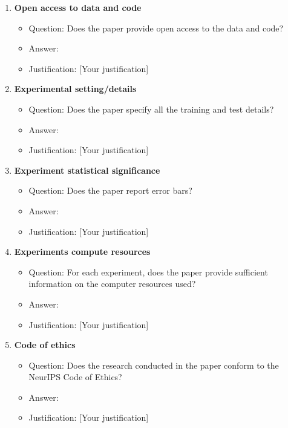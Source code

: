 \documentclass{article}
\begin{document}
\begin{enumerate}
  \item \textbf{Open access to data and code}
  \begin{itemize}
    \item Question: Does the paper provide open access to the data and code?
    \item Answer: \answerNo{}
    \item Justification: [Your justification]
  \end{itemize}

  \item \textbf{Experimental setting/details}
  \begin{itemize}
    \item Question: Does the paper specify all the training and test details?
    \item Answer: \answerYes{}
    \item Justification: [Your justification]
  \end{itemize}

  \item \textbf{Experiment statistical significance}
  \begin{itemize}
    \item Question: Does the paper report error bars?
    \item Answer: \answerYes{}
    \item Justification: [Your justification]
  \end{itemize}

  \item \textbf{Experiments compute resources}
  \begin{itemize}
    \item Question: For each experiment, does the paper provide sufficient information on the computer resources used?
    \item Answer: \answerYes{}
    \item Justification: [Your justification]
  \end{itemize}

  \item \textbf{Code of ethics}
  \begin{itemize}
    \item Question: Does the research conducted in the paper conform to the NeurIPS Code of Ethics?
    \item Answer: \answerYes{}
    \item Justification: [Your justification]
  \end{itemize}


\end{enumerate}
\end{document}
